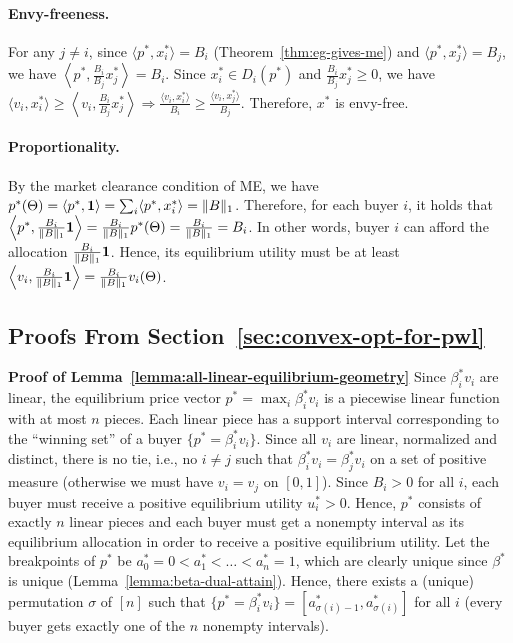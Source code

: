 	\paragraph{Envy-freeness.}
	For any $j\neq i$, since $\langle p^*, x^*_i \rangle = B_i$ (Theorem~\ref{thm:eg-gives-me}) and $\langle p^*, x^*_j \rangle = B_j$, we have 
	$ \left \langle p^*, \frac{B_i}{B_j}x^*_j \right \rangle = B_i$.
	Since $x^*_i \in D_i(p^*)$ and $\frac{B_i}{B_j}x^*_j \geq 0$, we have 
	$ \langle v_i, x^*_i \rangle \geq \left\langle v_i, \frac{B_i}{B_j} x^*_j \right \rangle \Rightarrow \frac{\langle v_i, x^*_i \rangle}{B_i} \geq \frac{\langle v_i, x^*_j \rangle}{B_j}$.
	Therefore, $x^*$ is envy-free.
	
	\paragraph{Proportionality.}
	By the market clearance condition of ME, we have
	$ p^*(\Theta) = \langle p^*, \mathbf{1} \rangle = \sum_i \langle p^*, x^*_i\rangle = \|B\|_1$.
	Therefore, for each buyer $i$, it holds that 
	$ \left \langle p^*, \frac{B_i}{\|B\|_1} \mathbf{1} \right \rangle = \frac{B_i}{\|B\|_1} p^*(\Theta) = \frac{B_i}{\|B\|_1} = B_i$.
	In other words, buyer $i$ can afford the allocation $\frac{B_i}{\|B\|_1} \mathbf{1} $. Hence, its equilibrium utility must be at least
	$ \left \langle v_i,\frac{B_i}{\|B\|_1}\mathbf{1} \right\rangle = \frac{B_i}{\|B\|_1}v_i(\Theta)$.
	
\subsection{Proofs From Section~\ref{sec:convex-opt-for-pwl}}
	\smallskip\noindent\textbf{Proof of Lemma~\ref{lemma:all-linear-equilibrium-geometry}}
		Since $\beta^*_i v_i$ are linear, the equilibrium price vector $p^* = \max_i \beta^*_i v_i$ is a piecewise linear function with at most $n$ pieces. Each linear piece has a support interval corresponding to the ``winning set'' of a buyer $\{p^* = \beta^*_i v_i\}$.
		Since all $v_i$ are linear, normalized and distinct, there is no tie, i.e., no $i\neq j$ such that $\beta^*_i v_i = \beta^*_j v_i$ on a set of positive measure (otherwise we must have $v_i = v_j$ on $[0,1]$).
		Since $B_i>0$ for all $i$, each buyer must receive a positive equilibrium utility $u^*_i>0$. 
		Hence, $p^*$ consists of exactly $n$ linear pieces and each buyer must get a nonempty interval as its equilibrium allocation in order to receive a positive equilibrium utility.
		Let the breakpoints of $p^*$ be $a^*_0 = 0 < a^*_1 < \dots < a^*_n = 1$, which are clearly unique since $\beta^*$ is unique (Lemma~\ref{lemma:beta-dual-attain}). 
		Hence, there exists a (unique) permutation $\sigma$ of $[n]$ such that $\{ p^* = \beta^*_i v_i \} = [a^*_{\sigma(i)-1}, a^*_{\sigma(i)}]$ for all $i$ (every buyer gets exactly one of the $n$ nonempty intervals). 
		
